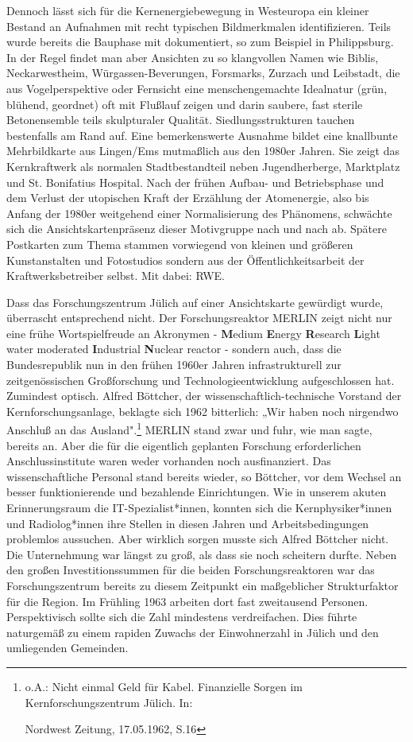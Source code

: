 \documentclass[a4paper,
fontsize=11pt,
oneside,
numbers=noperiodatend,
parskip=half-,
bibliography=totoc,
final
]{scrartcl}
\begin{document}
Dennoch lässt sich für die Kernenergiebewegung in Westeuropa ein kleiner
Bestand an Aufnahmen mit recht typischen Bildmerkmalen identifizieren.
Teils wurde bereits die Bauphase mit dokumentiert, so zum Beispiel in
Philippsburg. In der Regel findet man aber Ansichten zu so klangvollen
Namen wie Biblis, Neckarwestheim, Würgassen-Beverungen, Forsmarks,
Zurzach und Leibstadt, die aus Vogelperspektive oder Fernsicht eine
menschengemachte Idealnatur (grün, blühend, geordnet) oft mit Flußlauf
zeigen und darin saubere, fast sterile Betonensemble teils skulpturaler
Qualität. Siedlungsstrukturen tauchen bestenfalls am Rand auf. Eine
bemerkenswerte Ausnahme bildet eine knallbunte Mehrbildkarte aus
Lingen/Ems mutmaßlich aus den 1980er Jahren. Sie zeigt das Kernkraftwerk
als normalen Stadtbestandteil neben Jugendherberge, Marktplatz und St.
Bonifatius Hospital. Nach der frühen Aufbau- und Betriebsphase und dem
Verlust der utopischen Kraft der Erzählung der Atomenergie, also bis
Anfang der 1980er weitgehend einer Normalisierung des Phänomens,
schwächte sich die Ansichtskartenpräsenz dieser Motivgruppe nach und
nach ab. Spätere Postkarten zum Thema stammen vorwiegend von kleinen und
größeren Kunstanstalten und Fotostudios sondern aus der
Öffentlichkeitsarbeit der Kraftwerksbetreiber selbst. Mit dabei: RWE.

Dass das Forschungszentrum Jülich auf einer Ansichtskarte gewürdigt
wurde, überrascht entsprechend nicht. Der Forschungsreaktor MERLIN zeigt
nicht nur eine frühe Wortspielfreude an Akronymen - \textbf{M}edium
\textbf{E}nergy \textbf{R}esearch \textbf{L}ight water moderated
\textbf{I}ndustrial \textbf{N}uclear reactor - sondern auch, dass die
Bundesrepublik nun in den frühen 1960er Jahren infrastrukturell zur
zeitgenössischen Großforschung und Technologieentwicklung aufgeschlossen
hat. Zumindest optisch. Alfred Böttcher, der wissenschaftlich-technische
Vorstand der Kernforschungsanlage, beklagte sich 1962 bitterlich: „Wir
haben noch nirgendwo Anschluß an das Ausland".\footnote{o.A.: Nicht
  einmal Geld für Kabel. Finanzielle Sorgen im Kernforschungszentrum
  Jülich. In:

  Nordwest Zeitung, 17.05.1962, S.16} MERLIN stand zwar und fuhr, wie
man sagte, bereits an. Aber die für die eigentlich geplanten Forschung
erforderlichen Anschlussinstitute waren weder vorhanden noch
ausfinanziert. Das wissenschaftliche Personal stand bereits wieder, so
Böttcher, vor dem Wechsel an besser funktionierende und bezahlende
Einrichtungen. Wie in unserem akuten Erinnerungsraum die
IT-Spezialist*innen, konnten sich die Kernphysiker*innen und
Radiolog*innen ihre Stellen in diesen Jahren und Arbeitsbedingungen
problemlos aussuchen. Aber wirklich sorgen musste sich Alfred Böttcher
nicht. Die Unternehmung war längst zu groß, als dass sie noch scheitern
durfte. Neben den großen Investitionssummen für die beiden
Forschungsreaktoren war das Forschungszentrum bereits zu diesem
Zeitpunkt ein maßgeblicher Strukturfaktor für die Region. Im Frühling
1963 arbeiten dort fast zweitausend Personen. Perspektivisch sollte sich
die Zahl mindestens verdreifachen. Dies führte naturgemäß zu einem
rapiden Zuwachs der Einwohnerzahl in Jülich und den umliegenden
Gemeinden.
\end{document}
